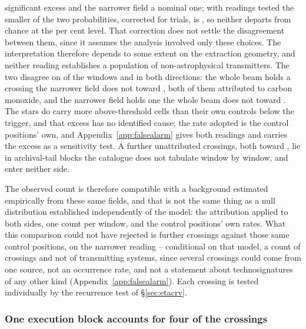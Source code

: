 significant excess and the narrower field a nominal one; with \FrNRead{}
readings tested the smaller of the two probabilities, corrected for
\FrNRead{} trials, is \FrTwoTrialP, so neither departs from chance at the
\CeAlphaPct{} per cent level. That correction does not settle the
disagreement between them, since it assumes the analysis involved only these
\FrNRead{} choices. The interpretation therefore depends to some extent on
the extraction geometry, and neither reading establishes a population of
non-astrophysical transmitters. The two disagree on \FrNFlag{} of the
\CeNWin{} windows and in both directions: the whole beam holds a crossing the
narrower field does not toward \FrUpStars, both of them attributed to carbon
monoxide, and the narrower field holds one the whole beam does not toward
\FrDownStars. The stars do carry more above-threshold cells than their own
controls below the trigger, and that excess has no identified cause; the rate
adopted is the control positions' own, and
Appendix~\ref{app:falsealarm} gives both readings and carries the excess
as a sensitivity test. A further \CeNTailCrossWord{} unattributed
crossings, both toward \CeTailStar, lie in archival-tail blocks the catalogue
does not tabulate window by window, and enter neither side.

The observed count is therefore compatible with a background estimated
empirically from these same fields, and that is not the same thing as a null
distribution established independently of the model: the attribution applied
to both sides, one count per window, and the control positions' own rates.
What this comparison could not have rejected is \CeAddLim{} further
crossings against those same control positions, \FrNarrowAddLim{} on the
narrower reading -- conditional on that model, a count of crossings and not
of transmitting systems, since several crossings could come from one source,
not an occurrence rate, and not a statement about technosignatures of any
other kind (Appendix~\ref{app:falsealarm}). Each
crossing is tested individually by the recurrence test of
\S\ref{sec:etacrv}.

\subsubsection{One execution block accounts for four of the crossings}
\label{sec:bdblock}

